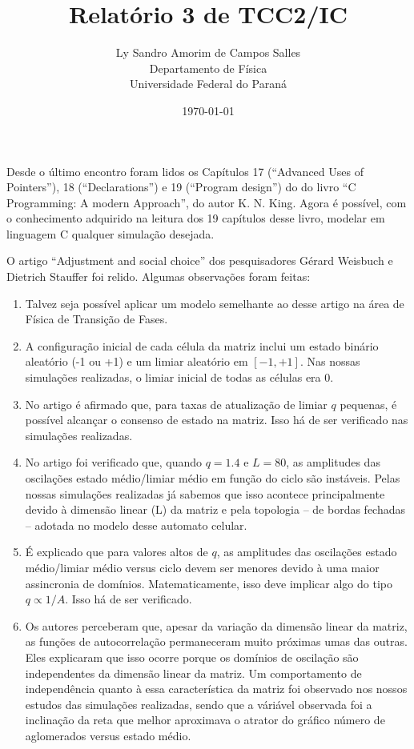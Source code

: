 \documentclass[12pt,a4paper,final]{article}
\title{Relatório 3 de TCC2/IC}
\author{Ly Sandro Amorim de Campos Salles\\Departamento de Física\\Universidade Federal do Paraná}
\date{\today}
\begin{document}
	\maketitle

	Desde o último encontro foram lidos os Capítulos 17 (``Advanced Uses of Pointers''), 18 (``Declarations'') e 19 (``Program design'') do do livro ``C Programming: A modern Approach'', do autor K. N. King. Agora é possível, com o conhecimento adquirido na leitura dos 19 capítulos desse livro, modelar em linguagem C qualquer simulação desejada.
  
  O artigo ``Adjustment and social choice'' dos pesquisadores Gérard Weisbuch e Dietrich Stauffer foi relido. Algumas observações foram feitas:
  \begin{enumerate}
    \item Talvez seja possível aplicar um modelo semelhante ao desse artigo na área de Física de Transição de Fases.
    \item A configuração inicial de cada célula da matriz inclui um estado binário aleatório (-1 ou +1) e um limiar aleatório em $[-1,+1]$. Nas nossas simulações realizadas, o limiar inicial de todas as células era $0$.
    \item No artigo é afirmado que, para taxas de atualização de limiar $q$ pequenas, é possível alcançar o consenso de estado na matriz. Isso há de ser verificado nas simulações realizadas.
    \item No artigo foi verificado que, quando $q = 1.4$ e $L = 80$, as amplitudes das oscilações estado médio/limiar médio em função do ciclo são instáveis. Pelas nossas simulações realizadas já sabemos que isso acontece principalmente devido à dimensão linear (L) da matriz e pela topologia -- de bordas fechadas -- adotada no modelo desse automato celular. \label{instabilidadeL}
    \item É explicado que para valores altos de $q$, as amplitudes das oscilações estado médio/limiar médio versus ciclo devem ser menores devido à uma maior assincronia de domínios. Matematicamente, isso deve implicar algo do tipo $q \propto 1/A$. Isso há de ser verificado.
    \item Os autores perceberam que, apesar da variação da dimensão linear da matriz, as funções de autocorrelação permaneceram muito próximas umas das outras. Eles explicaram que isso ocorre porque os domínios de oscilação são independentes da dimensão linear da matriz. Um comportamento de independência quanto à essa característica da matriz foi observado nos nossos estudos das simulações realizadas, sendo que a váriável observada foi a inclinação da reta que melhor aproximava o atrator do gráfico número de aglomerados versus estado médio. 

\end{enumerate}
\end{document}
